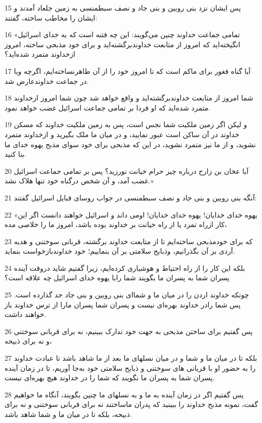 \par 15 پس ایشان نزد بنی روبین و بنی جاد و نصف سبطمنسی به زمین جلعاد آمدند و ایشان را مخاطب ساخته، گفتند:
\par 16 «تمامی جماعت خداوند چنین می‌گویند: این چه فتنه است که به خدای اسرائیل انگیخته‌اید که امروز از متابعت خداوندبرگشته‌اید و برای خود مذبحی ساخته، امروز ازخداوند متمرد شده‌اید؟
\par 17 آیا گناه فغور برای ماکم است که تا امروز خود را از آن طاهرنساخته‌ایم، اگر‌چه وبا در جماعت خداوندعارض شد.
\par 18 شما امروز از متابعت خداوندبرگشته‌اید و واقع خواهد شد چون شما امروز ازخداوند متمرد شده‌اید که او فردا بر تمامی جماعت اسرائیل غضب خواهد نمود.
\par 19 و لیکن اگر زمین ملکیت شما نجس است، پس به زمین ملکیت خداوند که مسکن خداوند در آن ساکن است عبور نمایید، و در میان ما ملک بگیرید و ازخداوند متمرد نشوید، و از ما نیز متمرد نشوید، در این که مذبحی برای خود سوای مذبح یهوه خدای ما بنا کنید.
\par 20 آیا عخان بن زارح درباره چیز حرام خیانت نورزید؟ پس بر تمامی جماعت اسرائیل غضب آمد، و آن شخص درگناه خود تنها هلاک نشد.»
\par 21 آنگه بنی روبین و بنی جاد و نصف سبطمنسی در جواب روسای قبایل اسرائیل گفتند:
\par 22 «یهوه خدای خدایان! یهوه خدای خدایان! اومی داند و اسرائیل خواهند دانست اگر این کار ازراه تمرد یا از راه خیانت بر خداوند بوده باشد، امروز ما را خلاصی مده،
\par 23 که برای خودمذبحی ساخته‌ایم تا از متابعت خداوند برگشته، قربانی سوختنی و هدیه آردی بر آن بگذرانیم، وذبایح سلامتی بر آن بنماییم؛ خود خداوندبازخواست بنماید.
\par 24 بلکه این کار را از راه احتیاط و هوشیاری کرده‌ایم، زیرا گفتیم شاید دروقت آینده پسران شما به پسران ما بگویند شما رابا یهوه خدای اسرائیل چه علاقه است؟
\par 25 چونکه خداوند اردن را در میان ما و شما‌ای بنی روبین و بنی جاد حد گذارده است. پس شما رادر خداوند بهره‌ای نیست و پسران شما پسران مارا از ترس خداوند باز خواهند داشت.
\par 26 پس گفتیم برای ساختن مذبحی به جهت خود تدارک ببینیم، نه برای قربانی سوختنی و نه برای ذبیحه،
\par 27 بلکه تا در میان ما و شما و در میان نسلهای ما بعد از ما شاهد باشد تا عبادت خداوند را به حضور او با قربانی های سوختنی و ذبایح سلامتی خود به‌جا آوریم، تا در زمان آینده پسران شما به پسران ما نگویند که شما را در خداوند هیچ بهره‌ای نیست.
\par 28 پس گفتیم اگر در زمان آینده به ما و به نسلهای ما چنین بگویند، آنگاه ما خواهیم گفت، نمونه مذبح خداوند را ببینید که پدران ماساختند نه برای قربانی سوختنی و نه برای ذبیحه، بلکه تا در میان ما و شما شاهد باشد.
